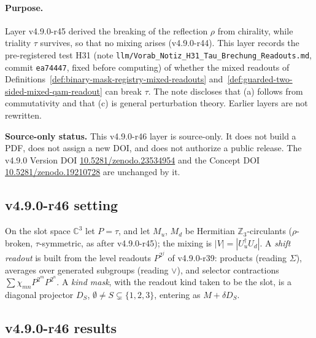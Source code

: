 \paragraph{Purpose.}
Layer v4.9.0-r45 derived the breaking of the reflection \(\rho\) from chirality, while triality \(\tau\) survives, so that no mixing arises
(v4.9.0-r44).  This layer records the pre-registered test H31 (note \texttt{llm/Vorab\_Notiz\_H31\_Tau\_Brechung\_Readouts.md}, commit
\texttt{ea74447}, fixed before computing) of whether the mixed readouts of
Definitions~\ref{def:binary-mask-registry-mixed-readouts} and~\ref{def:guarded-two-sided-mixed-qam-readout} can break \(\tau\).  The note
discloses that (a) follows from commutativity and that (c) is general perturbation theory.  Earlier layers are not rewritten.

\noindent\textbf{Source-only status.}
This v4.9.0-r46 layer is source-only.  It does not build a PDF, does not assign a new DOI,
and does not authorize a public release.  The v4.9.0 Version DOI
\href{https://doi.org/10.5281/zenodo.23534954}{10.5281/zenodo.23534954} and the Concept DOI
\href{https://doi.org/10.5281/zenodo.19210728}{10.5281/zenodo.19210728} are unchanged by it.

\subsection*{v4.9.0-r46 setting}
\label{subsec:v490-r46-setting}

On the slot space \(\mathbb C^3\) let \(P=\tau\), and let \(M_u\), \(M_d\) be Hermitian \(\mathbb Z_3\)-circulants (\(\rho\)-broken, \(\tau\)-symmetric, as
after v4.9.0-r45); the mixing is \(|V|=|U_u^\dagger U_d|\).  A \emph{shift readout} is built from the level readouts \(P^{2^j}\) of v4.9.0-r39:
products (reading \(\Sigma\)), averages over generated subgroups (reading \(\vee\)), and selector contractions \(\sum\chi_{mn}P^{2^m}P^{2^n}\).  A
\emph{kind mask}, with the readout kind taken to be the slot, is a diagonal projector \(D_S\), \(\emptyset\neq S\subsetneq\{1,2,3\}\), entering as
\(M+\delta D_S\).

\subsection*{v4.9.0-r46 results}
\label{subsec:v490-r46-results}

